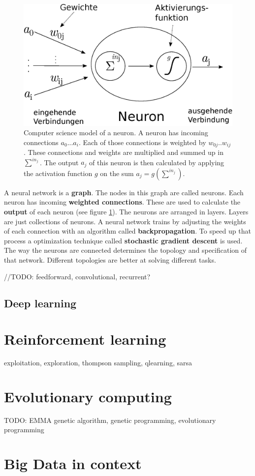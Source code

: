 \documentclass[jou,apacite]{apa6}
\begin{document}
\begin{figure}[!htb]
\centering
\includegraphics[width=.3\textwidth]{neuron.eps}
\caption[Computer science neuron abstraction]{Computer science model of a neuron. A neuron has incoming connections $a_0 ... a_i$. Each of those connections is weighted by $w_{0j} .. w_{ij}$. These connections and weights are multiplied and summed up in $\sum^{in_j}$. The output $a_j$ of this neuron is then calculated by applying the activation function $g$ on the sum $a_j = g(\sum^{in_j})$.}
\label{fig:neuron}
\end{figure}

A neural network is a \textbf{graph}. The nodes in this graph are called neurons. Each neuron has incoming \textbf{weighted connections}. These are used to calculate the \textbf{output} of each neuron (see figure \ref{fig:neuron}). The neurons are arranged in layers. Layers are just collections of neurons. A neural network trains by adjusting the weights of each connection with an algorithm called \textbf{backpropagation}. To speed up that process a optimization technique called \textbf{stochastic gradient descent} is used. The way the neurons are connected determines the topology and specification of that network. Different topologies are better at solving different tasks.

//TODO: feedforward, convolutional, recurrent?

\subsection{Deep learning}

\section{Reinforcement learning}
exploitation, exploration, thompson sampling, qlearning, sarsa

\section{Evolutionary computing}
TODO: EMMA
genetic algorithm, genetic programming, evolutionary programming

\section{Big Data in context}
\end{document}
